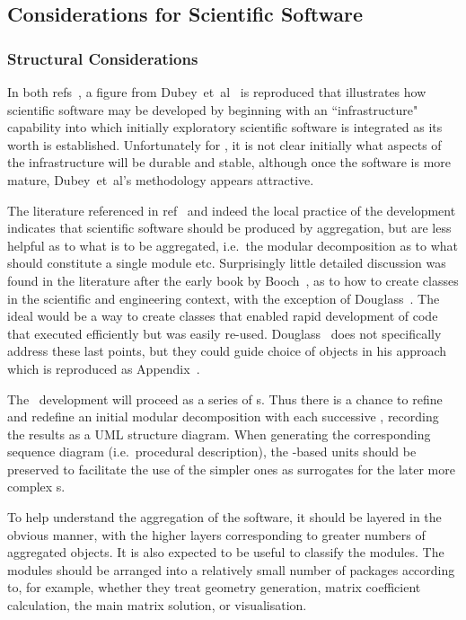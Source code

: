 \subsection{Considerations for Scientific Software}\label{sec:scistruct}
\subsubsection{Structural Considerations}\label{sec:structure}
In both refs~\cite{y1re331,y2re332}, a figure from Dubey~et~al~\cite{Du16Idea} is reproduced
that illustrates how scientific software may be developed by beginning with an ``infrastructure"
capability into which initially exploratory scientific software is integrated as its worth
is established. Unfortunately for \nep, it is not clear initially what  aspects  of the infrastructure
will be durable and stable, although once the software is more mature, Dubey~et~al's methodology
appears attractive.

The literature referenced in ref~\cite{y2re333} and indeed the local practice of the  development
indicates that scientific software should be produced by aggregation, but are less
helpful as to what is to be aggregated, i.e.\ the modular decomposition as to what should
constitute a single module etc. Surprisingly little detailed discussion was found in the literature
after the early book by Booch~\cite{booch}, as to how to create classes in
the scientific and engineering context, with the exception of Douglass~\cite[\S\,5]{douglass}.
The ideal would be a way to create classes that enabled rapid development  of code
that executed efficiently but was easily re-used.
Douglass~\cite[\S\,5]{douglass} does not specifically address these last points, but they
could guide choice of objects in his approach which is reproduced as Appendix~.

The \nep\ development will proceed as a series of \papp s. Thus there is a chance
to refine and redefine an initial modular decomposition with each successive \papp,
recording the results as a UML structure diagram. When generating the corresponding
sequence diagram (i.e.\ procedural description), the \papp-based units should be preserved to
facilitate the use of the simpler ones as surrogates for the later more complex \papp s.

To help understand the  aggregation of the software, it should be layered in the obvious manner,
with the higher layers corresponding to greater numbers of aggregated objects. It is also expected
to be useful to classify the modules.
The modules should be arranged into a relatively small number of packages according to, for example,
whether they treat
geometry generation, matrix coefficient calculation, the main matrix solution, or visualisation.
